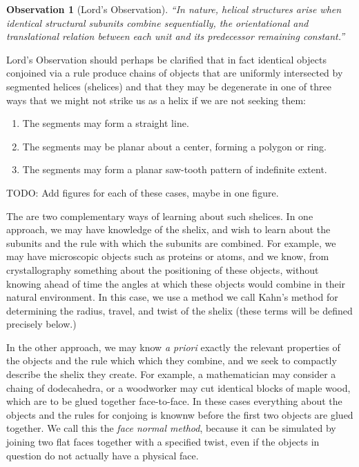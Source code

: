 \documentclass[11pt]{article}
\newtheorem{observation}{Observation}
\begin{document}
{\begin{observation}[Lord's Observation]
  “In nature, helical structures arise when identical structural subunits combine sequentially, the orientational and translational relation between each unit and its predecessor remaining constant.”\cite{lord2002helical}
\end{observation}
Lord's Observation should perhaps be clarified that in fact identical objects conjoined via a rule
produce chains of objects that are uniformly intersected by segmented helices (shelices) and that they may be degenerate in one of
three ways that we might not strike us as a helix if we are not seeking them:
\begin{enumerate}
\item The segments may form a straight line.
\item The segments may be planar about a center, forming a polygon or ring.
\item The segments may form a planar saw-tooth pattern of indefinite extent.
\end{enumerate}

TODO: Add figures for each of these cases, maybe in one figure.

The are two complementary ways of learning about such shelices. In one approach, we may have knowledge of the shelix, and
wish to learn about the subunits and the rule with which the subunits are combined. For example, we may have microscopic objects such as proteins
or atoms, and we know, from crystallography something about the positioning of these objects, without
knowing ahead of time the angles at which these objects would combine in their natural environment.
In this case, we use a method we call Kahn's method\cite{kahn1989defining} for determining the radius, travel, and twist
of the shelix (these terms will be defined precisely below.)

In the other approach, we may know {\it a priori} exactly the
relevant properties of the objects and the rule which which they combine, and we seek to compactly describe the shelix they create.
For example, a mathematician may consider a chaing of dodecahedra, or a woodworker may cut identical blocks of maple wood,
which are to be glued together face-to-face. In these cases everything about the objects and the rules for conjoing
is knownw before the first two objects are glued together. We call this the {\em face normal method}, because
it can be simulated by joining two flat faces together with a specified twist, even if the objects in question
do not actually have a physical face.

}
\end{document}
